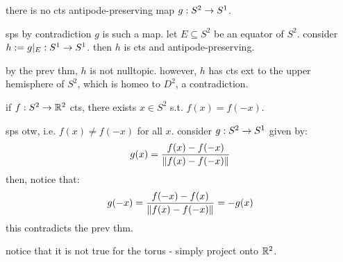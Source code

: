 \begin{prop}
    there is no cts antipode-preserving map $g:S^{2}\rightarrow S^{1}$.
\end{prop}

\begin{pf}[source=Primary Source Material]
    sps by contradiction $g$ is such a map.
    let $E\subseteq S^{2}$ be an equator of $S^{2}$.
    consider $h:=g\rvert_{E}:S^{1}\rightarrow S^{1}$.
    then $h$ is cts and antipode-preserving.

    by the prev thm, $h$ is not nulltopic.
    however, $h$ has cts ext to the upper hemisphere of $S^{2}$, which is homeo to $D^{2}$,
    a contradiction.
\end{pf}

\begin{thm}[title=Borsuk-Ulam]
    if $f:S^{2}\rightarrow\mathbb{R}^{2}$ cts, there exists $x\in S^{2}$ s.t. $f(x)=f(-x)$.
\end{thm}

\begin{pf}[source=Primary Source Material]
    sps otw, i.e. $f(x)\neq f(-x)$ for all $x$.
    consider $g:S^{2}\rightarrow S^{1}$ given by:
    \begin{equation*}
        g(x)=\frac{f(x)-f(-x)}{\norm{f(x)-f(-x)}}
    \end{equation*}
    then, notice that:
    \begin{equation*}
        g(-x)=\frac{f(-x)-f(x)}{\norm{f(x)-f(-x)}}=-g(x)
    \end{equation*}
    this contradicts the prev thm.
\end{pf}
notice that it is not true for the torus - simply project onto $\mathbb{R}^{2}$.






